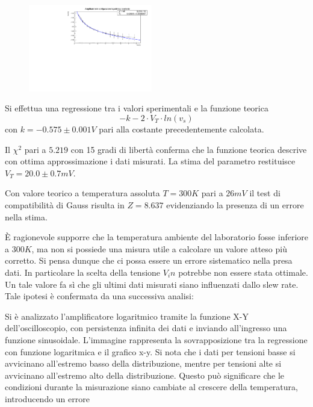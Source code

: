 \documentclass[journal]{IEEEtran}
\begin{document}
\begin{figure}[H]%
\begin {center}
\includegraphics[width=0.48\textwidth]{analysis/output/fit_log_vout_vin.pdf}
\caption{}
\label{fig:log_ampl_fit}
\end {center}
\end{figure}

Si effettua una regressione tra i valori sperimentali e la funzione teorica 
\begin{equation}
-k - 2 \cdot V_T \cdot ln(v_s)
\end{equation}
con $k = -0.575 \pm 0.001 V$ pari alla costante precedentemente calcolata.

Il $\chi^2$ pari a $5.219$ con 15 gradi di libertà conferma che la funzione teorica descrive con ottima approssimazione i dati misurati.
La stima del parametro restituisce $V_T = 20.0 \pm 0.7 mV$.

Con valore teorico a temperatura assoluta $T = 300K$ pari a $26 mV$ il test di compatibilità di Gauss risulta in $Z = 8.637$ evidenziando la presenza di un errore nella stima.

È ragionevole supporre che la temperatura ambiente del laboratorio fosse inferiore a $300 K$, ma non si possiede una misura utile a calcolare un valore atteso più corretto.
Si pensa dunque che ci possa essere un errore sistematico nella presa dati. In particolare la scelta della tensione $V_in$ potrebbe non essere stata ottimale. Un tale valore
fa sì che gli ultimi dati misurati siano influenzati dallo slew rate. Tale ipotesi è confermata da una successiva analisi:

Si è analizzato l'amplificatore logaritmico tramite la funzione X-Y dell'oscilloscopio, con persistenza infinita dei dati e inviando all'ingresso una funzione sinusoidale. L'immagine rappresenta la sovrapposizione tra la regressione con funzione logaritmica e il grafico x-y. Si nota che i dati per tensioni basse si avvicinano
all'estremo basso della distribuzione, mentre per tensioni alte si avvicinano all'estremo alto della distribuzione. Questo può significare che le condizioni durante la
misurazione siano cambiate al crescere della temperatura, introducendo un errore
\end{document}
